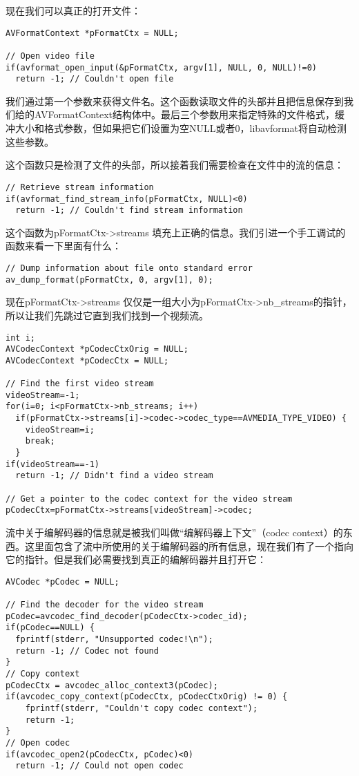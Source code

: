 现在我们可以真正的打开文件：
\begin{lstlisting}
AVFormatContext *pFormatCtx = NULL;

// Open video file
if(avformat_open_input(&pFormatCtx, argv[1], NULL, 0, NULL)!=0)
  return -1; // Couldn't open file
\end{lstlisting}

我们通过第一个参数来获得文件名。这个函数读取文件的头部并且把信息保存到我们给的AVFormatContext结构体中。最后三个参数用来指定特殊的文件格式，缓冲大小和格式参数，但如果把它们设置为空NULL或者0，libavformat将自动检测这些参数。

这个函数只是检测了文件的头部，所以接着我们需要检查在文件中的流的信息：
\begin{lstlisting}
// Retrieve stream information
if(avformat_find_stream_info(pFormatCtx, NULL)<0)
  return -1; // Couldn't find stream information
\end{lstlisting}

这个函数为pFormatCtx->streams 填充上正确的信息。我们引进一个手工调试的
函数来看一下里面有什么：
\begin{lstlisting}
// Dump information about file onto standard error
av_dump_format(pFormatCtx, 0, argv[1], 0);
\end{lstlisting}

现在pFormatCtx->streams 仅仅是一组大小为pFormatCtx->nb_streams的指针，所以让我们先跳过它直到我们找到一个视频流。
\begin{lstlisting}
int i;
AVCodecContext *pCodecCtxOrig = NULL;
AVCodecContext *pCodecCtx = NULL;

// Find the first video stream
videoStream=-1;
for(i=0; i<pFormatCtx->nb_streams; i++)
  if(pFormatCtx->streams[i]->codec->codec_type==AVMEDIA_TYPE_VIDEO) {
    videoStream=i;
    break;
  }
if(videoStream==-1)
  return -1; // Didn't find a video stream

// Get a pointer to the codec context for the video stream
pCodecCtx=pFormatCtx->streams[videoStream]->codec;
\end{lstlisting}

流中关于编解码器的信息就是被我们叫做“编解码器上下文”（codec context）的东西。这里面包含了流中所使用的关于编解码器的所有信息，现在我们有了一个指向它的指针。但是我们必需要找到真正的编解码器并且打开它：
\begin{lstlisting}
AVCodec *pCodec = NULL;

// Find the decoder for the video stream
pCodec=avcodec_find_decoder(pCodecCtx->codec_id);
if(pCodec==NULL) {
  fprintf(stderr, "Unsupported codec!\n");
  return -1; // Codec not found
}
// Copy context
pCodecCtx = avcodec_alloc_context3(pCodec);
if(avcodec_copy_context(pCodecCtx, pCodecCtxOrig) != 0) {
	fprintf(stderr, "Couldn't copy codec context");
	return -1;
}
// Open codec
if(avcodec_open2(pCodecCtx, pCodec)<0)
  return -1; // Could not open codec
\end{lstlisting}

